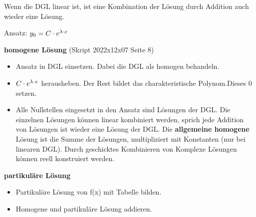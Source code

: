 
Wenn die DGL linear ist, ist eine Kombination der Lösung durch Addition auch wieder eine Lösung.

Ansatz: $y_0=C\cdot e^{\lambda \cdot x}$

\textbf{homogene Lösung} (Skript 2022x12x07 Seite 8)
\begin{itemize}
    \item Ansatz in DGL einsetzen. Dabei die DGL als homogen behandeln.
    \item $C\cdot e^{\lambda \cdot x}$ herausheben. Der Rest bildet das charakteristische Polynom.Dieses 0 setzen.
    \item Alle Nullstellen eingesetzt in den Ansatz sind Lösungen der DGL. Die einzelnen Lösungen können linear kombiniert werden, sprich jede Addition von Lösungen ist wieder eine Lösung der DGL. Die \textbf{allgemeine homogene} Lösung ist die Summe der Lösungen, multipliziert mit Konstanten (nur bei linearen DGL). Durch geschicktes Kombinieren von Komplexe Lösungen können reell konstruiert werden.
\end{itemize}

\textbf{partikuläre Lösung}
\begin{itemize}
    \item Partikuläre Lösung von f(x) mit Tabelle bilden.
    \item Homogene und partikuläre Lösung addieren.    
\end{itemize}


